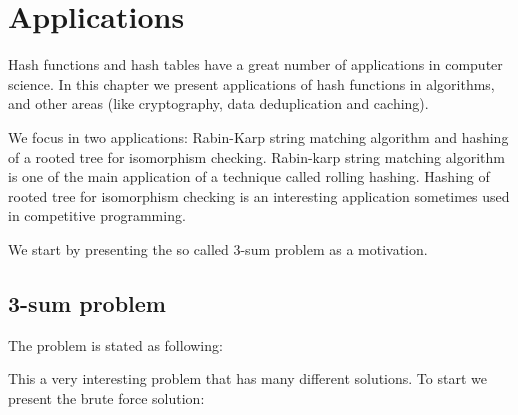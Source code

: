 \chapter{Applications}
\label{cap:Applications}


Hash functions and hash tables have a great number of applications in computer science. In this chapter we present applications of hash functions in algorithms, and other areas (like cryptography, data deduplication and caching).

We focus in two applications: Rabin-Karp \citep{RabinKarpWiki} string matching algorithm and hashing of a rooted tree for isomorphism checking. Rabin-karp string matching algorithm is one of the main application of a technique called rolling hashing. Hashing of rooted tree for isomorphism checking \citep{TreeIsomorphism} is an interesting application sometimes used in competitive programming.

We start by presenting the so called 3-sum problem as a motivation.

\section{3-sum problem}
The problem is stated as following:

\medskip


\medskip

This a very interesting problem that has many different solutions. To start we present the brute force solution:

\newpage

